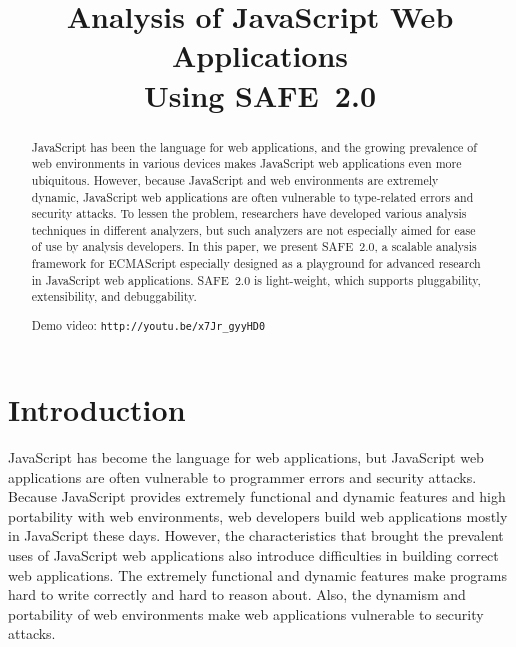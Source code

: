 \documentclass[10pt, conference]{IEEEtran}
\newcommand{\safe}{{SAFE~2.0}\xspace}
\begin{document}
\title{\hspace*{-.7em}
Analysis of JavaScript Web Applications\\ Using \safe}

\author{
\and
{}
\and
{}
\and
{}
}
\maketitle


\begin{abstract}
JavaScript has been the language for web applications, and
the growing prevalence of web environments in various devices
makes JavaScript web applications even more ubiquitous.
However, because JavaScript and web environments are
extremely dynamic, JavaScript web applications are often
vulnerable to type-related errors and security attacks.
To lessen the problem, researchers have developed various analysis
techniques in different analyzers, but such analyzers are not especially
aimed for ease of use by analysis developers.  In this paper, we present \safe, a scalable
analysis framework for ECMAScript especially designed as a playground
for advanced research in JavaScript web applications.  \safe is
light-weight, which supports pluggability, extensibility, and
debuggability.

Demo video: {\small\verb!http://youtu.be/x7Jr_gyyHD0!}
\end{abstract}


\section{Introduction}
JavaScript has become the language for web applications, but
JavaScript web applications are often vulnerable to programmer
errors and security attacks.  Because JavaScript provides
extremely functional and dynamic features and high portability
with web environments, web developers build web applications
mostly in JavaScript these days.  However, the characteristics
that brought the prevalent uses of JavaScript web applications
also introduce difficulties in building correct web applications.
The extremely functional and dynamic features make programs
hard to write correctly and hard to reason about.
Also, the dynamism and portability of web environments make
web applications vulnerable to security attacks.
\end{document}

